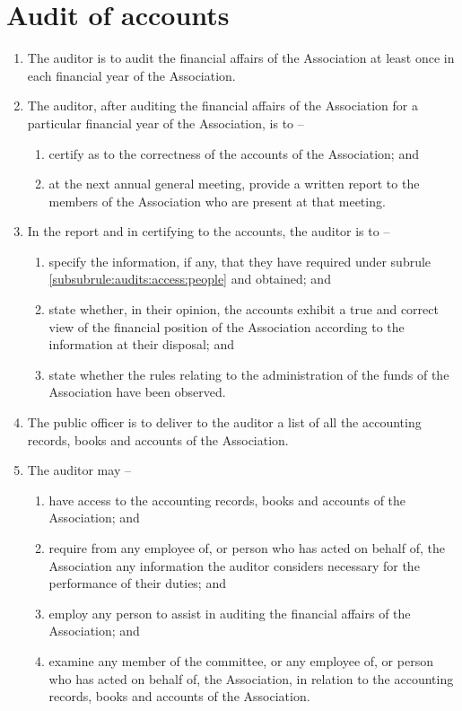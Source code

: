\section{Audit of accounts}
\label{rule:audits}

\begin{enumerate}
	\item The auditor is to audit the financial affairs of the Association at least once in each financial year of the Association.
	
	\item The auditor, after auditing the financial affairs of the Association for a particular financial year of the Association, is to --
	\begin{enumerate}
		\item certify as to the correctness of the accounts of the Association; and
		\item at the next annual general meeting, provide a written report to the members of the Association who are present at that meeting.
	\end{enumerate}

	\item In the report and in certifying to the accounts, the auditor is to --
	\begin{enumerate}
		\item specify the information, if any, that they have required under subrule \ref{subsubrule:audits:access:people} and obtained; and
		\item state whether, in their opinion, the accounts exhibit a true and correct view of the financial position of the Association according to the information at their disposal; and
		\item state whether the rules relating to the administration of the funds of the Association have been observed.
	\end{enumerate}

	\item The public officer is to deliver to the auditor a list of all the accounting records, books and accounts of the Association.

	\item \label{subrule:audits:access} The auditor may --
	\begin{enumerate}
		\item have access to the accounting records, books and accounts of the Association; and
		\item \label{subsubrule:audits:access:people} require from any employee of, or person who has acted on behalf of, the Association any information the auditor considers necessary for the performance of their duties; and
		\item employ any person to assist in auditing the financial affairs of the Association; and
		\item examine any member of the committee, or any employee of, or person who has acted on behalf of, the Association, in relation to the accounting records, books and accounts of the Association.
	\end{enumerate}
\end{enumerate}